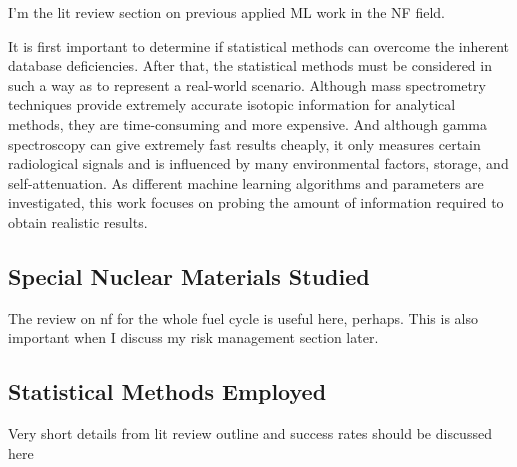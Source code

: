 I'm the lit review section on previous applied ML work in the NF field.

It is first important to determine if statistical methods can overcome the
inherent database deficiencies. After that, the statistical methods must be
considered in such a way as to represent a real-world scenario. Although mass
spectrometry techniques provide extremely accurate isotopic information for
analytical methods, they are time-consuming and more expensive. And although
gamma spectroscopy can give extremely fast results cheaply, it only measures
certain radiological signals and is influenced by many environmental factors,
storage, and self-attenuation. As different machine learning algorithms and
parameters are investigated, this work focuses on probing the amount of
information required to obtain realistic results.


\subsection{Special Nuclear Materials Studied}

The review on nf for the whole fuel cycle is useful here, perhaps. This is also 
important when I discuss my risk management section later. 

\subsection{Statistical Methods Employed}

Very short details from lit review outline and success rates should be 
discussed here
